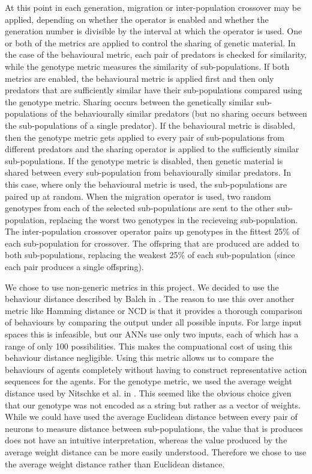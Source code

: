 \documentclass[12pt]{article} %
\begin{document}
At this point in each generation, migration or inter-population crossover may be applied, depending on whether the operator is enabled and whether the generation number is divisible by the interval at which the operator is used. One or both of the metrics are applied to control the sharing of genetic material. In the case of the behavioural metric, each pair of predators is checked for similarity, while the genotype metric measures the similarity of sub-populations. If both metrics are enabled, the behavioural metric is applied first and then only predators that are sufficiently similar have their sub-populations compared using the genotype metric. Sharing occurs between the genetically similar sub-populations of the behaviourally similar predators (but no sharing occurs between the sub-populations of a single predator). If the behavioural metric is disabled, then the genotype metric gets applied to every pair of sub-populations from different predators and the sharing operator is applied to the sufficiently similar sub-populations. If the genotype metric is disabled, then genetic material is shared between every sub-population from behaviourally similar predators. In this case, where only the behavioural metric is used, the sub-populations are paired up at random. When the migration operator is used, two random genotypes from each of the selected sub-populations are sent to the other sub-population, replacing the worst two genotypes in the recieveing sub-population. The inter-population crossover operator pairs up genotypes in the fittest 25\% of each sub-population for crossover. The offspring that are produced are added to both sub-populations, replacing the weakest 25\% of each sub-population (since each pair produces a single offspring).

We chose to use non-generic metrics in this project. We decided to use the behaviour distance described by Balch in \cite{Balch1997}. The reason to use this over another metric like Hamming distance or NCD is that it provides a thorough comparison of behaviours by comparing the output under all possible inputs. For large input spaces this is infeasible, but our ANNs use only two inputs, each of which has a range of only 100 possibilities. This makes the compuational cost of using this behaviour distance negligible. Using this metric allows us to compare the behaviours of agents completely without having to construct representative action sequences for the agents. For the genotype metric, we used the average weight distance used by Nitschke et al. in \cite{Nitschke2010}. This seemed like the obvious choice given that our genotype was not encoded as a string but rather as a vector of weights. While we could have used the average Euclidean distance between every pair of neurons to measure distance between sub-populations, the value that is produces does not have an intuitive interpretation, whereas the value produced by the average weight distance can be more easily understood. Therefore we chose to use the average weight distance rather than Euclidean distance.
\end{document}
